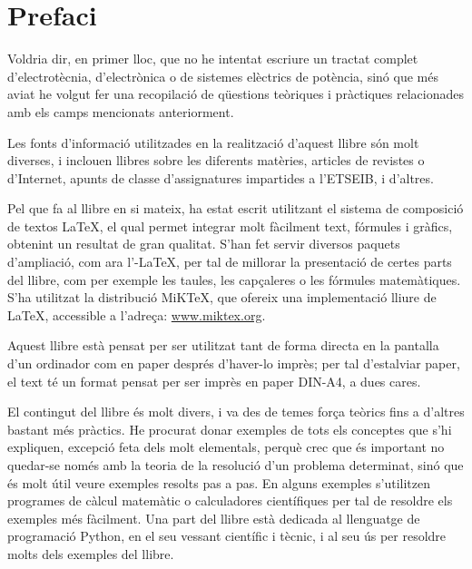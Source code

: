 \chapter*{Prefaci} 

   Voldria dir, en primer lloc, que no he intentat escriure un tractat complet
   d'electrotècnia, d'electrònica o de sistemes elèctrics de potència, sinó que més aviat
   he volgut
   fer una recopilació de qüestions teòriques i pràctiques relacionades amb els camps mencionats
   anteriorment.

   Les fonts d'informació utilitzades en la realització d'aquest llibre són molt diverses,
   i inclouen llibres sobre les diferents matèries, articles de revistes o d'Internet,
   apunts de classe d'assignatures impartides a l'ETSEIB, i d'altres.

   Pel que fa al llibre en si mateix, ha estat escrit utilitzant el sistema de composició de
   textos \LaTeX, el qual
   permet integrar molt fàcilment text, fórmules i gràfics, obtenint un resultat de
   gran qualitat. S'han fet servir diversos paquets d'ampliació, com ara
   l'\AmS-\LaTeX,
   per tal de millorar la presentació de certes parts del
   llibre, com per exemple les taules, les capçaleres o les fórmules matemàtiques. S'ha utilitzat la distribució MiK\TeX, que ofereix una implementació lliure de \LaTeX , accessible a l'adreça: \href{http://www.miktex.org/}{www.miktex.org}.

   Aquest llibre està pensat per  ser utilitzat tant de forma directa en la pantalla d'un
   ordinador com en paper després d'haver-lo imprès; per tal d'estalviar paper, el text
   té un format pensat per  ser imprès en paper DIN-A4, a dues cares.

    El contingut del llibre és molt divers, i va des de temes força teòrics fins a
    d'altres bastant més pràctics. He procurat donar exemples de tots els conceptes
    que s'hi expliquen, excepció feta dels molt elementals, perquè crec que és important
     no quedar-se només amb la teoria de  la resolució d'un problema determinat, sinó que
     és molt útil veure exemples resolts pas a pas. En alguns exemples s'utilitzen programes de càlcul matemàtic o calculadores científiques per tal de resoldre els exemples més fàcilment. Una part  del llibre està dedicada al llenguatge de programació Python, en el seu vessant científic i tècnic, i al seu ús  per resoldre molts dels exemples del llibre.

